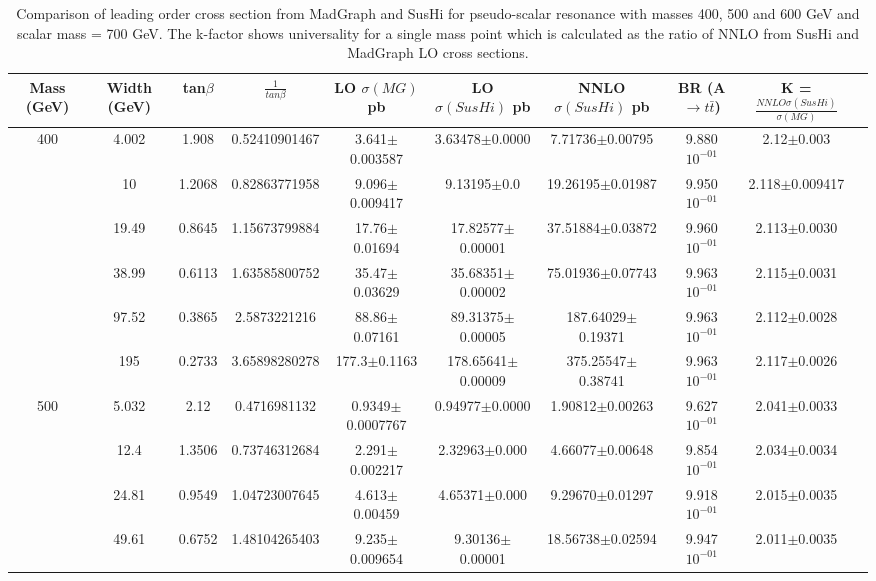 \begin{landscape}
\begin{table}[ht]
\caption{Comparison of leading order cross section from MadGraph and SusHi for pseudo-scalar resonance with masses 400, 500 and 600 GeV and scalar mass = 700 GeV. The k-factor shows universality for a single mass point which is calculated as the ratio of NNLO from SusHi and MadGraph LO cross sections.}
\centering
\begin{tabular}{| c | c | c | c | c | c | c | c | c | c |}
\hline\hline
Mass (GeV) & Width (GeV) & tan$\beta$ & $\frac{1}{tan\beta}$ & LO $\sigma(MG)$ pb & LO $\sigma(SusHi)$ pb & NNLO $\sigma(SusHi)$ pb & BR (A$\rightarrow t\bar{t}$) & K = $\frac{NNLO \sigma(SusHi)}{\sigma(MG)}$ \\ 
\hline\hline
\multirow {6}{*}{400}& 4.002 & 1.908 &  0.52410901467 & 3.641$\pm$0.003587 &  3.63478$\pm$0.0000 & 7.71736$\pm$0.00795 & 9.880$10^{-01}$ & 2.12$\pm$0.003\\
\cline{2-9}
& 10 & 1.2068 & 0.82863771958 & 9.096$\pm$0.009417 & 9.13195$\pm$0.0 & 19.26195$\pm$0.01987 & 9.950$10^{-01}$ & 2.118$\pm$0.009417\\
\cline{2-9}
& 19.49 & 0.8645 & 1.15673799884 & 17.76$\pm$0.01694 & 17.82577$\pm$0.00001 & 37.51884$\pm$0.03872 & 9.960$10^{-01}$ & 2.113$\pm$0.0030\\
\cline{2-9}
& 38.99 & 0.6113 & 1.63585800752 & 35.47$\pm$0.03629 & 35.68351$\pm$0.00002 & 75.01936$\pm$0.07743 & 9.963$10^{-01}$ & 2.115$\pm$0.0031\\
\cline{2-9}
& 97.52 & 0.3865 & 2.5873221216 & 88.86$\pm$0.07161 & 89.31375$\pm$0.00005 & 187.64029$\pm$0.19371 & 9.963$10^{-01}$ & 2.112$\pm$0.0028\\
\cline{2-9}
& 195 & 0.2733 & 3.65898280278 & 177.3$\pm$0.1163 & 178.65641$\pm$0.00009 & 375.25547$\pm$0.38741 & 9.963$10^{-01}$ & 2.117$\pm$0.0026\\
\hline \hline
\multirow {6}{*}{500} & 5.032 & 2.12 & 0.4716981132 & 0.9349$\pm$0.0007767 & 0.94977$\pm$0.0000 & 1.90812$\pm$0.00263 & 9.627$10^{-01}$ & 2.041$\pm$0.0033\\
\cline{2-9}
&12.4 & 1.3506 & 0.73746312684 & 2.291$\pm$0.002217 & 2.32963$\pm$0.000 & 4.66077$\pm$0.00648 &9.854$10^{-01}$ & 2.034$\pm$0.0034\\
\cline{2-9}
&24.81 & 0.9549 & 1.04723007645 & 4.613$\pm$0.00459 & 4.65371$\pm$0.000 & 9.29670$\pm$0.01297 & 9.918$10^{-01}$ & 2.015$\pm$0.0035\\
\cline{2-9}
&49.61 & 0.6752 & 1.48104265403 & 9.235$\pm$0.009654 & 9.30136$\pm$0.00001 & 18.56738$\pm$0.02594 & 9.947$10^{-01}$ & 2.011$\pm$0.0035\\

\end{tabular}
\end{table}
\end{landscape}
